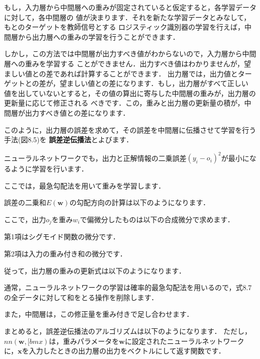 もし，入力層から中間層への重みが固定されていると仮定すると，各学習データに対して，各中間層の
値が決まります．それを新たな学習データとみなして，もとのターゲットを教師信号とする
ロジスティック識別器の学習を行えば，中間層から出力層への重みの学習を行うことができます．

しかし，この方法では中間層が出力すべき値がわからないので，入力層から中間層への重みを学習する
ことができません．出力すべき値はわかりませんが，望ましい値との差であれば計算することができます．
出力層では，出力値とターゲットとの差が，望ましい値との差になります．もし，出力層がすべて正しい
値を出していないとすると，その値の算出に寄与した中間層の重みが，出力層の更新量に応じて修正される
べきです．この，重みと出力層の更新量の積が，中間層が出力すべき値との差になります．

このように，出力層の誤差を求めて，その誤差を中間層に伝播させて学習を行う手法(図8.5)を
{\bf 誤差逆伝播法}とよびます．



ニューラルネットワークでも，出力と正解情報の二乗誤差$(y_i - o_i)^2$が最小になるように学習を行います．


ここでは，最急勾配法を用いて重みを学習します．



誤差の二乗和$E(\bm{w})$の勾配方向の計算は以下のようになります．



ここで，出力$o_j$を重み$w_i$で偏微分したものは以下の合成微分で求めます．


第1項はシグモイド関数の微分です．


第2項は入力の重み付き和の微分です．


従って，出力層の重みの更新式は以下のようになります．


通常，ニューラルネットワークの学習は確率的最急勾配法を用いるので，式8.7の全データに対して和をとる操作を削除します．

また，中間層は，この修正量を重み付きで足し合わせます．


まとめると，誤差逆伝播法のアルゴリズムは以下のようになります．
ただし，$nn(\bm{w}, [bm{x})$は，重みパラメータを$\bm{w}$に設定されたニューラルネットワークに，$\bm{x}$を入力したときの出力層の出力をベクトルにして返す関数です．


